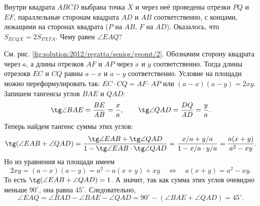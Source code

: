 Внутри квадрата $ABCD$ выбрана точка $X$ и через неё проведены отрезки
$PQ$ и $EF$, параллельные сторонам квадрата $AD$ и $AB$ соответственно,
с концами, лежащими на сторонах квадрата ($P$ на $AB$, $F$ на $AD$).
Оказалось, что $S_{ECQX} = 2 S_{PXFA}$.
Чему равен $\angle EAQ$?

\label{solution:2012/regatta/senior/geomt/2}%
См. рис. \ref{fig:solution:2012/regatta/senior/geomt/2}.
Обозначим сторону квадрата через $a$, а длины отрезков $AF$ и $AP$ через
$x$ и $y$ соответственно.
Тогда длины отрезокв $EC$ и $CQ$ равны $a - x$ и $a - y$ соответственно.
Условие на площади можно переформулировать так:
$EC \cdot CQ = AF \cdot AP$ или $(a - x) (a - y) = 2 x y$.
Запишем тангенсы углов $BAE$ и $QAD$:
\[
    \tg \angle BAE = \dfrac{BE}{AB} = \dfrac{x}{a}
,\qquad
    \tg \angle QAD = \dfrac{DQ}{AD} = \dfrac{y}{a}
.\]
Теперь найдем тангенс суммы этих углов:
\[
    \tg (\angle EAB + \angle QAD)
=
    \dfrac{
        \tg \angle EAB + \tg \angle QAD
    }{
        1 - \tg \angle EAB \cdot \tg \angle QAD
    }
=
    \dfrac{x / a + y / a}{1 - x / a \cdot y / a}
=
    \dfrac{a(x + y)}{a^2 - xy}
.\]
Но из уравнения на площади имеем
\[
    2 x y = (a - x) (a - y) = a^2 - a(x + y) + xy
\quad\Leftrightarrow\quad
    a (x + y) = a^2 - x y
.\]
То есть $\tg (\angle EAB + \angle QAD) = 1$.
А значит, так как сумма этих углов очевидно меньше $90^\circ$,
она равна $45^\circ$.
Следовательно,
\[
    \angle EAQ = \angle BAD - \angle BAE - \angle QAD
=
    90^\circ - (\angle BAE + \angle QAD) = 45^\circ
.\]

